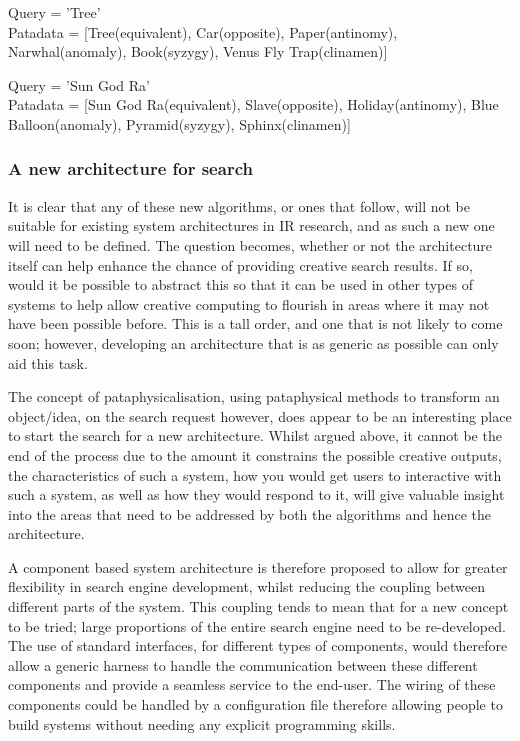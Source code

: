 Query      = 'Tree'\\
Patadata = [Tree(equivalent),  Car(opposite), Paper(antinomy), Narwhal(anomaly),
                        Book(syzygy), Venus Fly Trap(clinamen)]

Query      = 'Sun God Ra'\\
Patadata = [Sun God Ra(equivalent),  Slave(opposite), Holiday(antinomy), Blue
                        Balloon(anomaly), Pyramid(syzygy), Sphinx(clinamen)]

\subsubsection{A new architecture for search}

It is clear that any of these new algorithms, or ones that follow, will not be suitable for existing system architectures in IR research, and as such a new one will need to be defined. The question becomes, whether or not the architecture itself can help enhance the chance of providing creative search results. If so, would it be possible to abstract this so that it can be used in other types of systems to help allow creative computing to flourish in areas where it may not have been possible before. This is a tall order, and one that is not likely to come soon; however, developing an architecture that is as generic as possible can only aid this task.

The concept of pataphysicalisation, using pataphysical methods to transform an object/idea, on the search request however, does appear to be an interesting place to start the search for a new architecture. Whilst argued above, it cannot be the end of the process due to the amount it constrains the possible creative outputs, the characteristics of such a system, how you would get users to interactive with such a system, as well as how they would respond to it, will give valuable insight into the areas that need to be addressed by both the algorithms and hence the architecture.

A component based system architecture is therefore proposed to allow for greater flexibility in search engine development, whilst reducing the coupling between different parts of the system. This coupling tends to mean that for a new concept to be tried; large proportions of the entire search engine need to be re-developed. The use of standard interfaces, for different types of components, would therefore allow a generic harness to handle the communication between these different components and provide a seamless service to the end-user. The wiring of these components could be handled by a configuration file therefore allowing people to build systems without needing any explicit programming skills.

